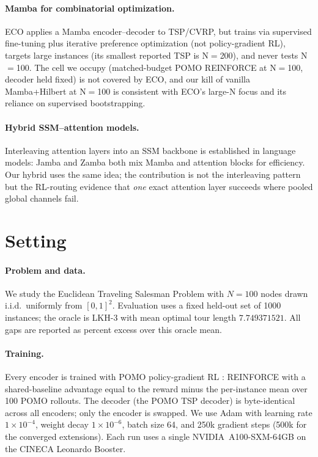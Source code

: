 \documentclass[11pt]{article}
\begin{document}
\paragraph{Mamba for combinatorial optimization.}
ECO \citep{eco2026} applies a Mamba encoder--decoder to TSP/CVRP, but trains via
supervised fine-tuning plus iterative preference optimization (not
policy-gradient RL), targets large instances (its smallest reported TSP is
N$=$200), and never tests N$=$100. The cell we occupy (matched-budget POMO
REINFORCE at N$=$100, decoder held fixed) is not covered by ECO, and our kill of
vanilla Mamba+Hilbert at N$=$100 is consistent with ECO's large-N focus and its
reliance on supervised bootstrapping.

\paragraph{Hybrid SSM--attention models.}
Interleaving attention layers into an SSM backbone is established in language
models: Jamba \citep{jamba2024} and Zamba \citep{zamba2024} both mix Mamba and
attention blocks for efficiency. Our hybrid uses the same idea; the contribution
is not the interleaving pattern but the RL-routing evidence that \emph{one} exact
attention layer succeeds where pooled global channels fail.

\section{Setting}
\label{sec:setting}

\paragraph{Problem and data.}
We study the Euclidean Traveling Salesman Problem with $N=100$ nodes drawn
i.i.d.\ uniformly from $[0,1]^2$. Evaluation uses a fixed held-out set of 1000
instances; the oracle is LKH-3 \citep{lkh3} with mean optimal tour length
$7.749371521$. All gaps are reported as percent excess over this oracle mean.

\paragraph{Training.}
Every encoder is trained with POMO policy-gradient RL \citep{pomo2020}: REINFORCE
with a shared-baseline advantage equal to the reward minus the per-instance mean
over 100 POMO rollouts. The decoder (the POMO TSP decoder) is byte-identical
across all encoders; only the encoder is swapped. We use Adam with learning rate
$1\times10^{-4}$, weight decay $1\times10^{-6}$, batch size 64, and 250k gradient
steps (500k for the converged extensions). Each run uses a single
NVIDIA~A100-SXM-64GB on the CINECA Leonardo Booster.
\end{document}
